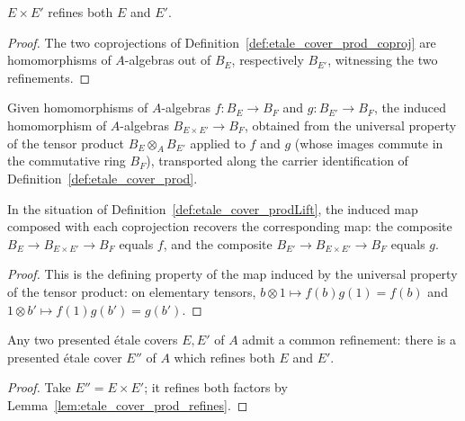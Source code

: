 \begin{lemma}
  \label{lem:etale_cover_prod_refines}
  \leanok
  \(E \times E'\) refines both \(E\) and \(E'\).
\end{lemma}
\begin{proof}
  \leanok
  The two coprojections of Definition~\ref{def:etale_cover_prod_coproj} are homomorphisms of
  \(A\)-algebras out of \(B_E\), respectively \(B_{E'}\), witnessing the two refinements.
\end{proof}

\begin{definition}
  \label{def:etale_cover_prodLift}
  \leanok
  Given homomorphisms of \(A\)-algebras \(f \colon B_E \to B_F\) and \(g \colon B_{E'} \to
  B_F\), the induced homomorphism of \(A\)-algebras \(B_{E \times E'} \to B_F\), obtained from
  the universal property of the tensor product \(B_E \otimes_A B_{E'}\) applied to \(f\) and
  \(g\) (whose images commute in the commutative ring \(B_F\)), transported along the carrier
  identification of Definition~\ref{def:etale_cover_prod}.
\end{definition}

\begin{lemma}
  \label{lem:etale_cover_prodLift_comp}
  \leanok
  In the situation of Definition~\ref{def:etale_cover_prodLift}, the induced map composed with
  each coprojection recovers the corresponding map: the composite \(B_E \to B_{E \times E'} \to
  B_F\) equals \(f\), and the composite \(B_{E'} \to B_{E \times E'} \to B_F\) equals \(g\).
\end{lemma}
\begin{proof}
  \leanok
  This is the defining property of the map induced by the universal property of the tensor
  product: on elementary tensors, \(b \otimes 1 \mapsto f(b) g(1) = f(b)\) and
  \(1 \otimes b' \mapsto f(1) g(b') = g(b')\).
\end{proof}

\begin{theorem}[Directedness]
  \label{thm:etale_cover_exists_refines_prod}
  \leanok
  Any two presented \'etale covers \(E, E'\) of \(A\) admit a common refinement: there is a
  presented \'etale cover \(E''\) of \(A\) which refines both \(E\) and \(E'\).
\end{theorem}
\begin{proof}
  \leanok
  Take \(E'' = E \times E'\); it refines both factors by Lemma~\ref{lem:etale_cover_prod_refines}.
\end{proof}

